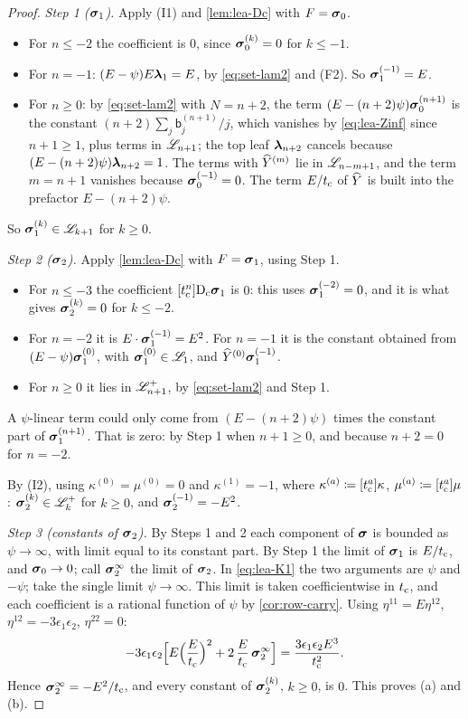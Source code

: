 \begin{proof}
\emph{Step 1 ($\boldsymbol{\sigma}_1$).} Apply (I1) and \cref{lem:lea-Dc} with $F=\boldsymbol{\sigma}_0$.
\begin{itemize}
\item For $n\le-2$ the coefficient is $0$, since $\boldsymbol{\sigma}_0^{(k)}=0$ for $k\le-1$.
\item For $n=-1$: $(E-\psi)E\boldsymbol{\lambda}_1=E$, by \cref{eq:set-lam2} and (F2). So $\boldsymbol{\sigma}_1^{(-1)}=E$.
\item For $n\ge0$: by \cref{eq:set-lam2} with $N=n+2$, the term $(E-(n+2)\psi)\boldsymbol{\sigma}_0^{(n+1)}$ is the constant $(n+2)\sum_j\mathsf{b}_j^{(n+1)}/j$, which vanishes by \cref{eq:lea-Zinf} since $n+1\ge1$, plus terms in $\mathscr{L}_{n+1}$; the top leaf $\boldsymbol{\lambda}_{n+2}$ cancels because $(E-(n+2)\psi)\boldsymbol{\lambda}_{n+2}=1$. The terms with $\widehat{Y}^{(m)}$ lie in $\mathscr{L}_{n-m+1}$, and the term $m=n+1$ vanishes because $\boldsymbol{\sigma}_0^{(-1)}=0$. The term $E/t_{\mathrm{c}}$ of $\widehat{Y}$ is built into the prefactor $E-(n+2)\psi$.
\end{itemize}
So $\boldsymbol{\sigma}_1^{(k)}\in\mathscr{L}_{k+1}$ for $k\ge0$.

\emph{Step 2 ($\boldsymbol{\sigma}_2$).} Apply \cref{lem:lea-Dc} with $F=\boldsymbol{\sigma}_1$, using Step 1.
\begin{itemize}
\item For $n\le-3$ the coefficient $[t_{\mathrm{c}}^n]\mathrm{D}_{\mathrm{c}}\boldsymbol{\sigma}_1$ is $0$: this uses $\boldsymbol{\sigma}_1^{(-2)}=0$, and it is what gives $\boldsymbol{\sigma}_2^{(k)}=0$ for $k\le-2$.
\item For $n=-2$ it is $E\cdot\boldsymbol{\sigma}_1^{(-1)}=E^2$. For $n=-1$ it is the constant obtained from $(E-\psi)\boldsymbol{\sigma}_1^{(0)}$, with $\boldsymbol{\sigma}_1^{(0)}\in\mathscr{L}_1$, and $\widehat{Y}^{(0)}\boldsymbol{\sigma}_1^{(-1)}$.
\item For $n\ge0$ it lies in $\mathscr{L}^{+}_{n+1}$, by \cref{eq:set-lam2} and Step 1.
\end{itemize}
A $\psi$-linear term could only come from $(E-(n+2)\psi)$ times the constant part of $\boldsymbol{\sigma}_1^{(n+1)}$. That is zero: by Step 1 when $n+1\ge0$, and because $n+2=0$ for $n=-2$.

By (I2), using $\kappa^{(0)}=\mu^{(0)}=0$ and $\kappa^{(1)}=-1$, where $\kappa^{(a)}\coloneqq[t_{\mathrm{c}}^a]\kappa$, $\mu^{(a)}\coloneqq[t_{\mathrm{c}}^a]\mu$: $\boldsymbol{\sigma}_2^{(k)}\in\mathscr{L}^{+}_k$ for $k\ge0$, and $\boldsymbol{\sigma}_2^{(-1)}=-E^2$.

\emph{Step 3 (constants of $\boldsymbol{\sigma}_2$).} By Steps 1 and 2 each component of $\boldsymbol{\sigma}$ is bounded as $\psi\to\infty$, with limit equal to its constant part. By Step 1 the limit of $\boldsymbol{\sigma}_1$ is $E/t_{\mathrm{c}}$, and $\boldsymbol{\sigma}_0\to0$; call $\boldsymbol{\sigma}_2^\infty$ the limit of $\boldsymbol{\sigma}_2$. In \cref{eq:lea-K1} the two arguments are $\psi$ and $-\psi$; take the single limit $\psi\to\infty$. This limit is taken coefficientwise in $t_{\mathrm{c}}$, and each coefficient is a rational function of $\psi$ by \cref{cor:row-carry}. Using $\eta^{11}=E\eta^{12}$, $\eta^{12}=-3\epsilon_1\epsilon_2$, $\eta^{22}=0$:
\[
-3\epsilon_1\epsilon_2\Bigl[E\Bigl(\frac{E}{t_{\mathrm{c}}}\Bigr)^2+2\,\frac{E}{t_{\mathrm{c}}}\,\boldsymbol{\sigma}_2^\infty\Bigr]=\frac{3\epsilon_1\epsilon_2E^3}{t_{\mathrm{c}}^2}.
\]
Hence $\boldsymbol{\sigma}_2^\infty=-E^2/t_{\mathrm{c}}$, and every constant of $\boldsymbol{\sigma}_2^{(k)}$, $k\ge0$, is $0$. This proves (a) and (b).


\end{proof}
